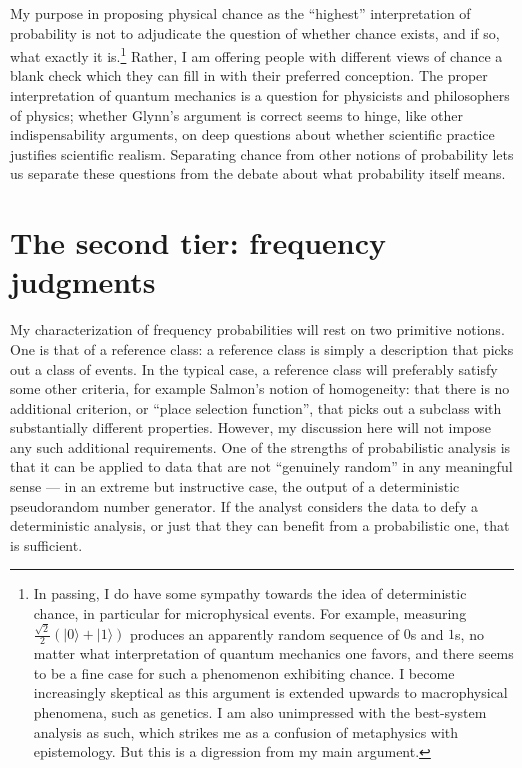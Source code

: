 \documentclass[letterpaper,12pt]{article}
\begin{document}
My purpose in proposing physical chance as the ``highest'' interpretation of probability is not to adjudicate the question of whether chance exists, and if so, what exactly it is.\footnote{In passing, I do have some sympathy towards the idea of deterministic chance, in particular for microphysical events. For example, measuring $\frac{\sqrt{2}}{2}(|0\rangle + |1\rangle)$ produces an apparently random sequence of $0$s and $1$s, no matter what interpretation of quantum mechanics one favors, and there seems to be a fine case for such a phenomenon exhibiting chance. I become increasingly skeptical as this argument is extended upwards to macrophysical phenomena, such as genetics. I am also unimpressed with the best-system analysis as such, which strikes me as a confusion of metaphysics with epistemology. But this is a digression from my main argument.} Rather, I am offering people with different views of chance a blank check which they can fill in with their preferred conception. The proper interpretation of quantum mechanics is a question for physicists and philosophers of physics; whether Glynn's argument is correct seems to hinge, like other indispensability arguments, on deep questions about whether scientific practice justifies scientific realism. Separating chance from other notions of probability lets us separate these questions from the debate about what probability itself means.

\section{The second tier: frequency judgments}
\label{sec:frequencyJudgments}
My characterization of frequency probabilities will rest on two primitive notions. One is that of a reference class: a reference class is simply a description that picks out a class of events. In the typical case, a reference class will preferably satisfy some other criteria, for example Salmon's \citeyearpar{Salmon1971-SALSE} notion of homogeneity: that there is no additional criterion, or ``place selection function'', that picks out a subclass with substantially different properties. However, my discussion here will not impose any such additional requirements. One of the strengths of probabilistic analysis is that it can be applied to data that are not ``genuinely random'' in any meaningful sense --- in an extreme but instructive case, the output of a deterministic pseudorandom number generator. If the analyst considers the data to defy a deterministic analysis, or just that they can benefit from a probabilistic one, that is sufficient.
\end{document}
